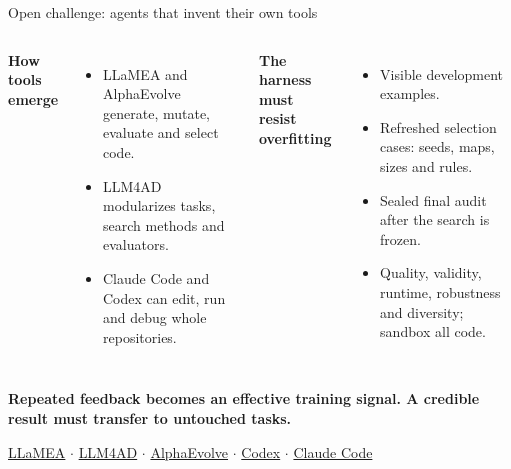 \documentclass[aspectratio=169,11pt]{beamer}
\begin{document}
\begin{frame}{Open challenge: agents that invent their own tools}
\centering\resizebox{.84\textwidth}{!}{}
\par\vspace{2mm}
\begin{columns}[T]
\raggedright\footnotesize
\textbf{How tools emerge}
\begin{itemize}\setlength\itemsep{0mm}
\item LLaMEA and AlphaEvolve generate, mutate, evaluate and select code.
\item LLM4AD modularizes tasks, search methods and evaluators.
\item Claude Code and Codex can edit, run and debug whole repositories.
\end{itemize}
\raggedright\footnotesize
\textbf{The harness must resist overfitting}
\begin{itemize}\setlength\itemsep{0mm}
\item Visible development examples.
\item Refreshed selection cases: seeds, maps, sizes and rules.
\item Sealed final audit after the search is frozen.
\item Quality, validity, runtime, robustness and diversity; sandbox all code.
\end{itemize}
\end{columns}
\par\vspace{1mm}\small\textbf{Repeated feedback becomes an effective training
signal. A credible result must transfer to untouched tasks.}
\par\vspace{1mm}
\scriptsize
\href{https://arxiv.org/abs/2405.20132}{LLaMEA} $\cdot$
\href{https://arxiv.org/abs/2412.17287}{LLM4AD} $\cdot$
\href{https://storage.googleapis.com/deepmind-media/DeepMind.com/Blog/alphaevolve-a-gemini-powered-coding-agent-for-designing-advanced-algorithms/AlphaEvolve.pdf}{AlphaEvolve} $\cdot$
\href{https://openai.com/codex/}{Codex} $\cdot$
\href{https://support.claude.com/en/articles/11845131-use-claude-code-with-your-team-or-enterprise-plan}{Claude Code}
\end{frame}
\end{document}
